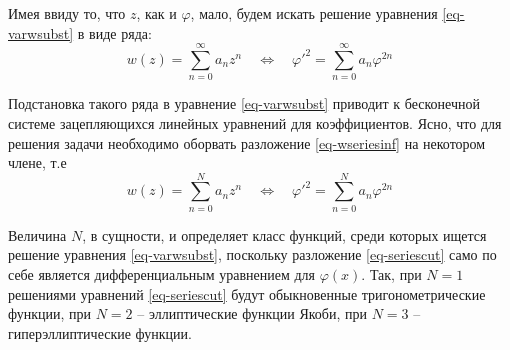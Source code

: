 Имея ввиду то, что $z$, как и $\varphi$, мало, будем искать решение уравнения \eqref{eq-varwsubst} в виде ряда:
\begin{equation}
w(z) = \sum_{n=0}^\infty a_n z^n \quad \Leftrightarrow \quad 
\varphi'^2 = \sum_{n=0}^\infty a_n \varphi^{2n}
\label{eq-wseriesinf}
\end{equation}

Подстановка такого ряда в уравнение \eqref{eq-varwsubst} приводит к бесконечной системе зацепляющихся линейных уравнений для коэффициентов.
Ясно, что для решения задачи необходимо оборвать разложение \eqref{eq-wseriesinf} на некотором члене, т.е 
\begin{equation}
w(z) = \sum_{n=0}^N a_n z^n \quad \Leftrightarrow \quad 
\varphi'^2 = \sum_{n=0}^N a_n \varphi^{2n}
\label{eq-seriescut}
\end{equation}

Величина $N$, в сущности, и определяет класс функций, среди которых ищется решение уравнения \eqref{eq-varwsubst}, поскольку разложение \eqref{eq-seriescut} само по себе является дифференциальным уравнением для $\varphi(x)$.
Так, при $N=1$ решениями уравнений \eqref{eq-seriescut} будут обыкновенные тригонометрические функции, при $N=2$ -- эллиптические функции Якоби, при $N=3$ -- гиперэллиптические функции.
